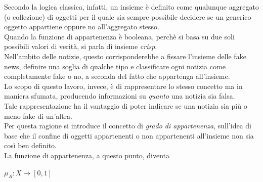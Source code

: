 \documentclass[12pt]{report}
\theoremstyle{definition}
\begin{document}
Secondo la logica classica, infatti, un insieme è definito come qualunque aggregato (o collezione) di oggetti per il quale sia sempre possibile decidere se un generico oggetto appartiene oppure no all'aggregato stesso.
\\
Quando la funzione di appartenenza è booleana, perchè si basa su due soli possibili valori di verità, si parla di insieme \textit{crisp}.
\\
Nell'ambito delle notizie, questo corrisponderebbe a fissare l'insieme delle fake news, definire una soglia di qualche tipo e classificare ogni notizia come completamente fake o no, a seconda del fatto che appartenga all'insieme.
\\
Lo scopo di questo lavoro, invece, è di rappresentare lo stesso concetto ma in maniera sfumata, producendo informazioni su \textit{quanto} una notizia sia falsa.
\\
Tale rappresentazione ha il vantaggio di poter indicare se una notizia sia più o meno fake di un'altra.
\\
Per questa ragione si introduce il concetto di \textit{grado di appartenenza}, sull'idea di base che il confine di oggetti appartenenti o non appartenenti all'insieme non sia così ben definito.
\\
La funzione di appartenenza, a questo punto, diventa 
\begin{center}
    $\mu_A: X \rightarrow [0,1]$
\end{center}
\end{document}
